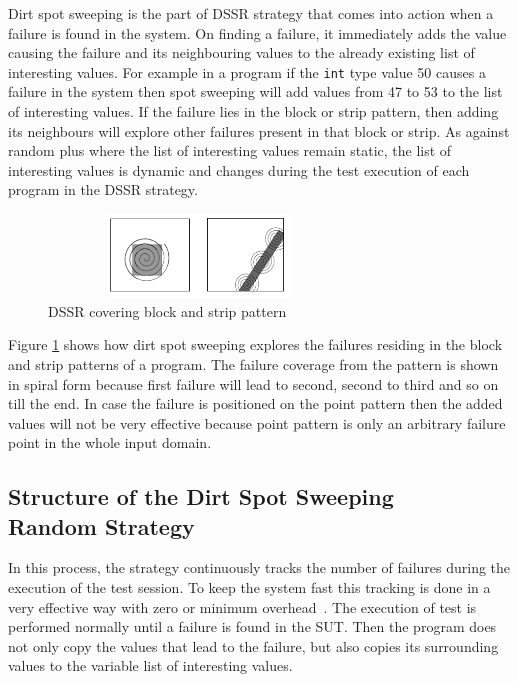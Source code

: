\documentclass{acm_proc_article-sp}
\begin{document}
Dirt spot sweeping is the part of DSSR strategy that comes into action when a failure is found in the system. On finding a failure, it immediately adds the value causing the failure and its neighbouring values to the already existing list of interesting values. For example in a program if the \verb+int+ type value 50 causes a failure in the system then spot sweeping will add values from 47 to 53 to the list of interesting values. If the failure lies in the block or strip pattern, then adding its neighbours will explore other failures present in that block or strip. As against random plus where the list of interesting values remain static, the list of interesting values is dynamic and changes during the test execution of each program in the DSSR strategy.

\begin{figure}[ht]
\centering
\includegraphics[width=8cm,height=2.2cm]{block2.png}
\caption{DSSR covering block and strip pattern}
\label{fig:block2}
\end{figure}

Figure \ref{fig:block2} shows how dirt spot sweeping explores the failures residing in the block and strip patterns of a program. The failure coverage from the pattern is shown in spiral form because first failure will lead to second, second to third and so on till the end. In case the failure is positioned on the point pattern then the added values will not be very effective because point pattern is only an arbitrary failure point in the whole input domain.

\subsection{Structure of the Dirt Spot Sweeping \\ Random Strategy}

In this process, the strategy continuously tracks the number of failures during the execution of the test session. To keep the system fast this tracking is done in a very effective way with zero or minimum overhead~\cite{Leitner2009}. The execution of test is performed normally until a failure is found in the SUT. Then the program does not only copy the values that lead to the failure, but also copies its surrounding values to the variable list of interesting values. 
\end{document}

